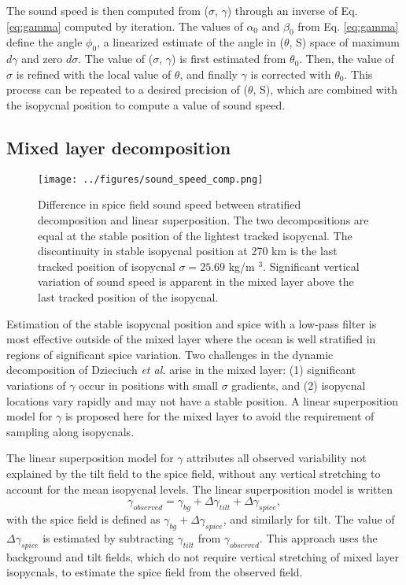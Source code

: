\documentclass[preprint,NumberedRefs]{JASA}
\begin{document}
The sound speed is then computed from ($\sigma$, $\gamma$) through an inverse of Eq. \eqref{eq:gamma} computed by iteration. The values of $\alpha_0$ and $\beta_0$ from Eq. \eqref{eq:gamma} define the angle $\phi_0$, a linearized estimate of the angle in ($\theta$, S) space of maximum $d\gamma$ and zero $d\sigma$. The value of ($\sigma$, $\gamma$) is first estimated from $\theta_0$. Then, the value of $\sigma$ is refined with the local value of $\theta$, and finally $\gamma$ is corrected with $\theta_0$. This process can be repeated to a desired precision of ($\theta$, S), which are combined with the isopycnal position to compute a value of sound speed.

\subsection{Mixed layer decomposition}
\begin{figure}
\texttt{[image: ../figures/sound\_speed\_comp.png]}
    \caption{\label{fig:c_diff}{Difference in spice field sound speed between stratified decomposition and linear superposition. The two decompositions are equal at the stable position of the lightest tracked isopycnal. The discontinuity in stable isopycnal position at 270 km is the last tracked position of isopycnal $\sigma=25.69$ kg/m $^3$. Significant vertical variation of sound speed is apparent in the mixed layer above the last tracked position of the isopycnal.}}
\end{figure}

Estimation of the stable isopycnal position and spice with a low-pass filter is most effective outside of the mixed layer where the ocean is well stratified in regions of significant spice variation. Two challenges in the dynamic decomposition of Dzieciuch \emph{et al.}\citep{dzieciuch2004} arise in the mixed layer: (1) significant variations of $\gamma$ occur in positions with small $\sigma$ gradients, and (2) isopycnal locations vary rapidly and may not have a stable position. A linear superposition model for $\gamma$ is proposed here for the mixed layer to avoid the requirement of sampling along isopycnals.

The linear superposition model for $\gamma$ attributes all observed variability not explained by the tilt field to the spice field, without any vertical stretching to account for the mean isopycnal levels. The linear superposition model is written
\begin{equation}
    \gamma_{observed} = \gamma_{bg} + \Delta \gamma_{tilt} + \Delta \gamma_{spice},
    \label{eq:lin_sup}
\end{equation}
with the spice field is defined as $\gamma_{bg} + \Delta \gamma_{spice}$, and similarly for tilt. The value of $\Delta \gamma_{spice}$ is estimated by subtracting $\gamma_{tilt}$ from $\gamma_{observed}$. This approach uses the background and tilt fields, which do not require vertical stretching of mixed layer isopycnals, to estimate the spice field from the observed field.
\end{document}
